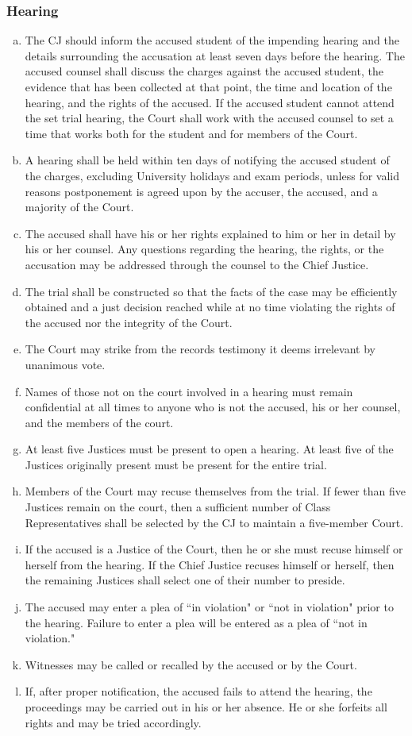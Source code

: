 \documentclass[USletter,12pt]{article}
\begin{document}
\subsubsection{Hearing}
\begin{enumerate}[(a)]
\item The CJ should inform the accused student of the impending hearing and the details surrounding the accusation at least seven days before the hearing.  The accused counsel shall discuss the charges against the accused student, the evidence that has been collected at that point, the time and location of the hearing, and the rights of the accused.  If the accused student cannot attend the set trial hearing, the Court shall work with the accused counsel to set a time that works both for the student and for members of the Court.
\item A hearing shall be held within ten days of notifying the accused student of the charges, excluding University holidays and exam periods, unless for valid reasons postponement is agreed upon by the accuser, the accused, and a majority of the Court.
\item The accused shall have his or her rights explained to him or her in detail by his or her counsel.  Any questions regarding the hearing, the rights, or the accusation may be addressed through the counsel to the Chief Justice.
\item The trial shall be constructed so that the facts of the case may be efficiently obtained and a just decision reached while at no time violating the rights of the accused nor the integrity of the Court.
\item The Court may strike from the records testimony it deems irrelevant by unanimous vote.
\item Names of those not on the court involved in a hearing must remain confidential at all times to anyone who is not the accused, his or her counsel, and the members of the court.
\item At least five Justices must be present to open a hearing.  At least five of the Justices originally present must be present for the entire trial.
\item Members of the Court may recuse themselves from the trial.  If fewer than five Justices remain on the court, then a sufficient number of Class Representatives shall be selected by the CJ to maintain a five-member Court.
\item If the accused is a Justice of the Court, then he or she must recuse himself or herself from the hearing. If the Chief Justice recuses himself or herself, then the remaining Justices shall select one of their number to preside.
\item The accused may enter a plea of ``in violation" or ``not in violation" prior to the hearing.  Failure to enter a plea will be entered as a plea of ``not in violation."
\item Witnesses may be called or recalled by the accused or by the Court.
\item If, after proper notification, the accused fails to attend the hearing, the proceedings may be carried out in his or her absence. He or she forfeits all rights and may be tried accordingly.
\end{enumerate}
\end{document}
